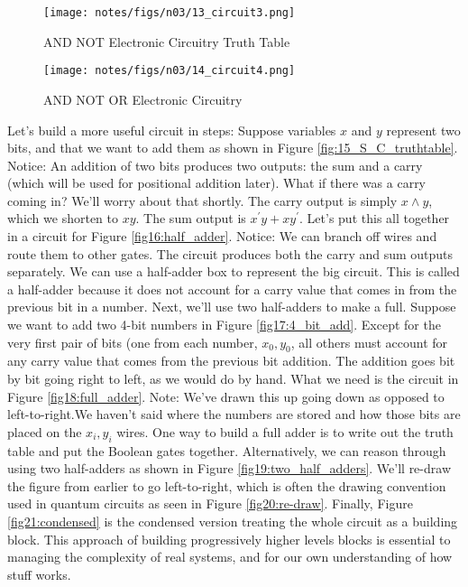 \documentclass[main.tex]{subfiles}
\begin{document}
\begin{figure}
    \centering
    \texttt{[image: notes/figs/n03/13\_circuit3.png]}
    \caption{AND NOT Electronic Circuitry Truth Table}
    \label{fig:13_AND_NOT_electronic_circuitry_truthtable}
\end{figure}

\begin{figure}
    \centering
    \texttt{[image: notes/figs/n03/14\_circuit4.png]}
    \caption{AND NOT OR Electronic Circuitry}
    \label{fig:14_AND_NOT_OR_electronic_circuitry}
\end{figure}

Let's build a more useful circuit in steps: Suppose variables $x$ and $y$ represent two bits, and that we want to add them as shown in Figure \ref{fig:15_S_C_truthtable}. Notice: An addition of two bits produces two outputs: the sum and a carry (which will be used for positional addition later). What if there was a carry coming in? We'll worry about that shortly. The carry output is simply $x \wedge y$, which we shorten to $x y$. The sum output is $x^{\prime} y+x y^{\prime}$. Let's put this all together in a circuit for Figure \ref{fig16:half_adder}. Notice: We can branch off wires and route them to other gates. The circuit produces both the carry and sum outputs separately. We can use a half-adder box to represent the big circuit. This is called a half-adder because it does not account for a carry value that comes in from the previous bit in a number. Next, we'll use two half-adders to make a full. Suppose we want to add two 4-bit numbers in Figure \ref{fig17:4_bit_add}. Except for the very first pair of bits (one from each number, $x_{0}, y_{0}$, all others must account for any carry value that comes from the previous bit addition. The addition goes bit by bit going right to left, as we would do by hand. What we need is the circuit in Figure \ref{fig18:full_adder}. Note: We've drawn this up going down as opposed to left-to-right.We haven't said where the numbers are stored and how those bits are placed on the $x_{i}, y_{i}$ wires. One way to build a full adder is to write out the truth table and put the Boolean gates together. Alternatively, we can reason through using two half-adders as shown in Figure \ref{fig19:two_half_adders}. We'll re-draw the figure from earlier to go left-to-right, which is often the drawing convention used in quantum circuits as seen in Figure \ref{fig20:re-draw}. Finally, Figure \ref{fig21:condensed} is the condensed version treating the whole circuit as a building block. This approach of building progressively higher levels blocks is essential to managing the complexity of real systems, and for our own understanding of how stuff works.
\end{document}
